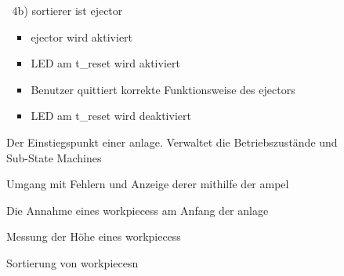 \begin{enumerate}
\begin{enumerate}
        \item[4b)] \gls{sortierer} ist \gls{ejector}
        \begin{itemize}
            \item \Gls{ejector} wird aktiviert
            \item LED am \gls{t_reset} wird aktiviert
            \item Benutzer quittiert korrekte Funktionsweise des \gls{ejector}s
            \item LED am \gls{t_reset} wird deaktiviert
        \end{itemize}
    \end{enumerate}
    \item[]

\end{enumerate}


\begin{figure}
    \caption{Der Einstiegspunkt einer \gls{anlage}.
    Verwaltet die Betriebszustände und Sub-State Machines}
    \label{fig:stm_top_level}
\end{figure}

\begin{figure}
    \caption{Umgang mit Fehlern und Anzeige derer mithilfe der \gls{ampel}}
    \label{fig:stm_error}
\end{figure}

\begin{figure}
    \caption{Die Annahme eines \glspl{workpiece}s am Anfang der \gls{anlage}}
    \label{fig:stm_werkstueck_annahme}
\end{figure}

\begin{figure}
    \caption{Messung der Höhe eines \glspl{workpiece}s}
    \label{fig:stm_hoehe_messen}
\end{figure}

\begin{figure}
    \caption{Sortierung von \glspl{workpiece}n}
    \label{fig:stm_werkstueck_sortieren}
\end{figure}


